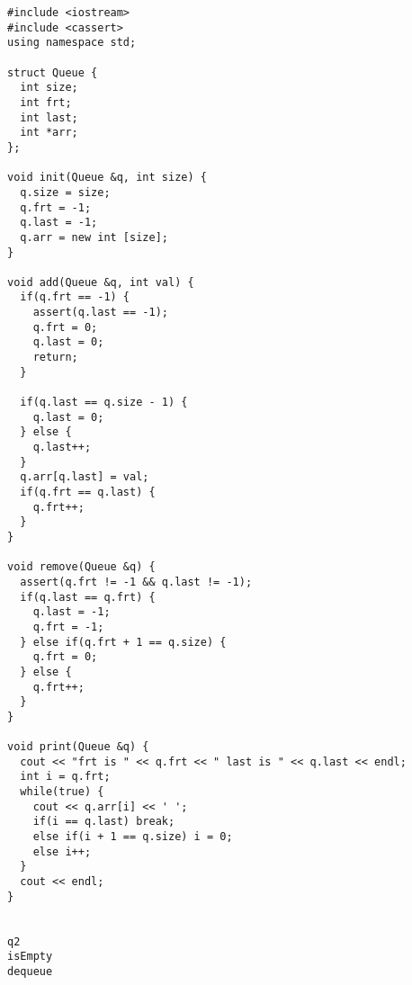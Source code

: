 \documentclass[12pt]{article}
\begin{document}
\begin{verbatim}
#include <iostream>
#include <cassert>
using namespace std;

struct Queue {
  int size;
  int frt;
  int last;
  int *arr;
};

void init(Queue &q, int size) {
  q.size = size;
  q.frt = -1;
  q.last = -1;
  q.arr = new int [size];
}

void add(Queue &q, int val) {
  if(q.frt == -1) {
    assert(q.last == -1);
    q.frt = 0;
    q.last = 0;
    return;
  }

  if(q.last == q.size - 1) {
    q.last = 0;
  } else {
    q.last++;
  }
  q.arr[q.last] = val;
  if(q.frt == q.last) {
    q.frt++;
  }
}

void remove(Queue &q) {
  assert(q.frt != -1 && q.last != -1);
  if(q.last == q.frt) {
    q.last = -1;
    q.frt = -1;
  } else if(q.frt + 1 == q.size) {
    q.frt = 0;
  } else {
    q.frt++;
  }
}

void print(Queue &q) {
  cout << "frt is " << q.frt << " last is " << q.last << endl;
  int i = q.frt;
  while(true) {
    cout << q.arr[i] << ' ';
    if(i == q.last) break;
    else if(i + 1 == q.size) i = 0;
    else i++;
  }
  cout << endl;
}


q2
isEmpty
dequeue
\end{verbatim}
\end{document}

